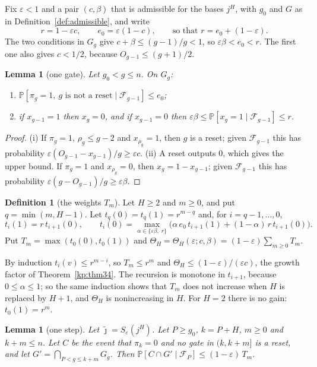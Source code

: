 \documentclass[11pt]{amsart}
\newtheorem{lemma}[theorem]{Lemma}
\theoremstyle{definition}
\newtheorem{definition}[theorem]{Definition}
\theoremstyle{remark}
\newcommand{\eps}{\varepsilon}
\newcommand{\jt}{\tilde{\jmath}}
\newcommand{\PP}{\mathbb{P}}
\newcommand{\cF}{\mathcal{F}}
\begin{document}
Fix $\eps<1$ and a pair $(c,\beta)$ that is admissible for the bases $j^H$, with $g_0$ and $G$ as
in Definition~\ref{def:admissible}, and write
\[
r=1-\eps c,\qquad e_0=\eps(1-c),\qquad\text{so that } r=e_0+(1-\eps).
\]
The two conditions in $G_g$ give $c+\beta\le(g-1)/g<1$, so $\eps\beta<e_0<r$. The first one
also gives $c<1/2$, because $O_{g-1}\le(g+1)/2$.

\begin{lemma}[one gate]\label{lem:onegate}
Let $g_0<g\le n$. On $G_g$:
\begin{enumerate}[label=(\roman*),leftmargin=2.4em]
\item $\PP[\pi_g=1,\ g\text{ is not a reset}\mid\cF_{g-1}]\le e_0$;
\item if $x_{g-1}=1$ then $x_g=0$, and if $x_{g-1}=0$ then
$\eps\beta\le\PP[x_g=1\mid\cF_{g-1}]\le r$.
\end{enumerate}
\end{lemma}

\begin{proof}
(i) If $\pi_g=1$, $\rho_g\le g-2$ and $x_{\rho_g}=1$, then $g$ is a reset; given $\cF_{g-1}$ this has
probability $\eps(O_{g-1}-x_{g-1})/g\ge\eps c$. (ii) A reset outputs $0$, which gives the upper
bound. If $\pi_g=1$ and $x_{\rho_g}=0$, then $x_g=1-x_{g-1}$; given $\cF_{g-1}$ this has probability
$\eps(g-O_{g-1})/g\ge\eps\beta$.
\end{proof}

\begin{definition}[the weights $T_m$]\label{def:Tm}
Let $H\ge2$ and $m\ge0$, and put $q=\min(m,H-1)$. Let $t_q(0)=t_q(1)=r^{m-q}$ and, for
$i=q-1,\dots,0$,
\[
t_i(1)=r\,t_{i+1}(0),\qquad
t_i(0)=\max_{\alpha\in\{\eps\beta,\;r\}}\bigl(\alpha\,e_0\,t_{i+1}(1)+(1-\alpha)\,r\,t_{i+1}(0)\bigr).
\]
Put $T_m=\max(t_0(0),t_0(1))$ and $\Theta_H=\Theta_H(\eps;c,\beta)=(1-\eps)\sum_{m\ge0}T_m$.
\end{definition}

By induction $t_i(v)\le r^{m-i}$, so $T_m\le r^m$ and $\Theta_H\le(1-\eps)/(\eps c)$, the growth
factor of Theorem~\ref{kp:thm34}. The recursion is monotone in $t_{i+1}$, because $0\le\alpha\le1$; so the same
induction shows that $T_m$ does not increase when $H$ is replaced by $H+1$, and $\Theta_H$ is nonincreasing in $H$. For $H=2$ there is no gain: $t_0(1)=r^m$.

\begin{lemma}[one step]\label{lem:onestep}
Let $\jt=S_\eps(j^H)$. Let $P\ge g_0$, $k=P+H$, $m\ge0$ and $k+m\le n$. Let $C$ be the event that
$\pi_k=0$ and no gate in $(k,k+m]$ is a reset, and let $G'=\bigcap_{P<g\le k+m}G_g$. Then
$\PP[C\cap G'\mid\cF_P]\le(1-\eps)\,T_m$.
\end{lemma}
\end{document}
